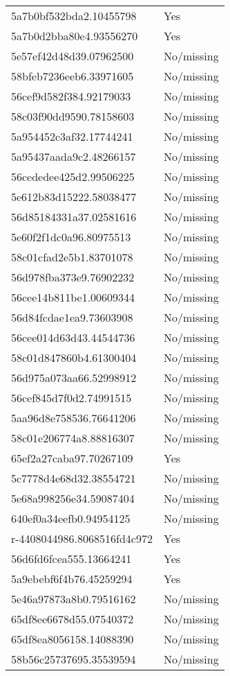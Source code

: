 \begin{tabular}{ll}
5a7b0bf532bda2.10455798 & Yes \\
5a7b0d2bba80e4.93556270 & Yes \\
5e57ef42d48d39.07962500 & No/missing \\
58bfeb7236eeb6.33971605 & No/missing \\
56cef9d582f384.92179033 & No/missing \\
58c03f90dd9590.78158603 & No/missing \\
5a954452c3af32.17744241 & No/missing \\
5a95437aada9c2.48266157 & No/missing \\
56cededee425d2.99506225 & No/missing \\
5e612b83d15222.58038477 & No/missing \\
56d85184331a37.02581616 & No/missing \\
5e60f2f1dc0a96.80975513 & No/missing \\
58c01cfad2e5b1.83701078 & No/missing \\
56d978fba373e9.76902232 & No/missing \\
56cee14b811be1.00609344 & No/missing \\
56d84fcdae1ea9.73603908 & No/missing \\
56cee014d63d43.44544736 & No/missing \\
58c01d847860b4.61300404 & No/missing \\
56d975a073aa66.52998912 & No/missing \\
56cef845d7f0d2.74991515 & No/missing \\
5aa96d8e758536.76641206 & No/missing \\
58c01e206774a8.88816307 & No/missing \\
65ef2a27caba97.70267109 & Yes \\
5c7778d4e68d32.38554721 & No/missing \\
5e68a998256e34.59087404 & No/missing \\
640ef0a34eefb0.94954125 & No/missing \\
r-4408044986.8068516fd4c972 & Yes \\
56d6fd6fcea555.13664241 & Yes \\
5a9ebebf6f4b76.45259294 & Yes \\
5e46a97873a8b0.79516162 & No/missing \\
65df8ee6678d55.07540372 & No/missing \\
65df8ea8056158.14088390 & No/missing \\
58b56c25737695.35539594 & No/missing \\

\end{tabular}

